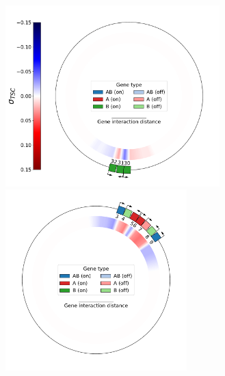 \begin{figure}[H]
  \centering
  \begin{subfigure}[t]{\textwidth}
    \centering
    \includegraphics[height=7cm]{ploscb/img/sub_3_genes_30_env_A.pdf}
    \hspace{-0.5cm}
    \includegraphics[height=7cm]{ploscb/img/sub_7_genes_03_env_B.pdf}
  \end{subfigure}


\end{figure}
